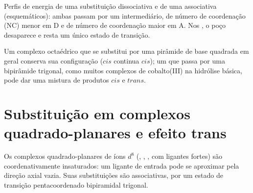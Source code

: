 \begin{omfigure}

{\small Perfis de energia de uma substituição dissociativa e de uma associativa
(esquemáticos): ambas passam por um intermediário, de número de coordenação (NC)
menor em D e de número de coordenação maior em A. Nos ,
o poço desaparece e resta um único estado de transição.}
\end{omfigure}

Um complexo octaédrico que se substitui por uma pirâmide de base quadrada em geral
conserva sua configuração ($cis$ continua $cis$); um que passa por uma bipirâmide
trigonal, como muitos complexos de cobalto(III) na hidrólise básica, pode dar uma
mistura de produtos $cis$ e $trans$.

\section{Substituição em complexos quadrado-planares e efeito trans}

Os complexos quadrado-planares de íons $d^8$ (, , ,  com ligantes fortes)
são coordenativamente insaturados: um ligante de entrada pode se aproximar pela
direção axial vazia. Suas substituições são associativas, por um estado de
transição pentacoordenado bipiramidal trigonal.


